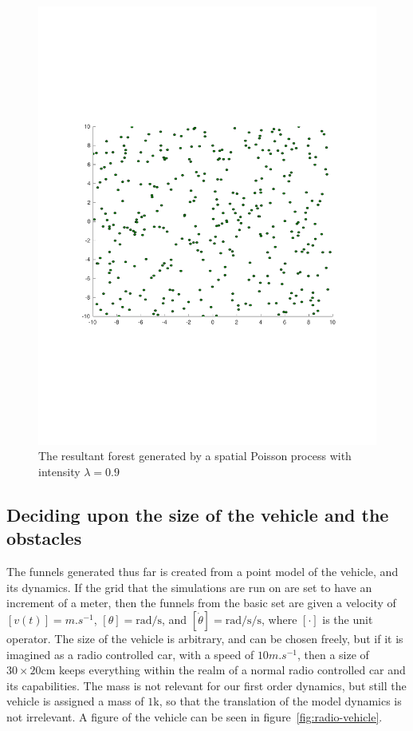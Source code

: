 \begin{figure}
\begin{minipage}[b]{0.4\textwidth}
    \includegraphics[width=\textwidth]{figures/experiments/poisson09}
    \caption{The resultant forest generated by a spatial Poisson process with
      intensity \(\lambda = 0.9\)}
    \label{fig:poisson09}
  \end{minipage}
\end{figure}

\subsection{Deciding upon the size of the vehicle and the obstacles}

The funnels generated thus far is created from a point model of the vehicle, and
its dynamics. If the grid that the simulations are run on are set to have an
increment of a meter, then the funnels from the basic set are given a velocity
of \([v(t)] = \si{m.s^{-1}}\), \([\theta] = \si{\radian\per\second}\), and
\([\dot{\theta}] = \si{\radian\per\second\per\second}\), where \([\cdot]\) is
the unit operator. The size of the vehicle is arbitrary, and can be chosen
freely, but if it is imagined as a radio controlled car, with a speed of
\(10\si{m.s^{-1}}\), then a size of \(30 \times 20 \si{\centi\metre} \) keeps
everything within the realm of a normal radio controlled car and its
capabilities. The mass is not relevant for our first order dynamics, but still
the vehicle is assigned a mass of \(1 \si{\kilo}\), so that the translation of
the model dynamics is not irrelevant. A figure of the vehicle can be seen in
figure~\cref{fig:radio-vehicle}.

